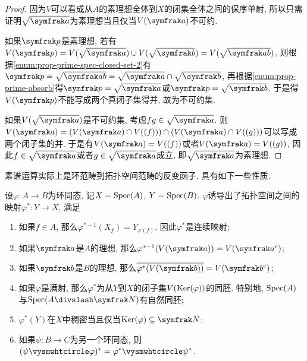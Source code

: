 \begin{proof}
  因为$V$可以看成从$A$的素理想全体到$X$的闭集全体之间的保序单射, 所以只需证明$\sqrt{\ideal{a}}$为素理想当且仅当$V(\ideal{a})$不可约.

  如果$\ideal{p}$是素理想, 若有$V(\ideal{p})=V(\sqrt{\ideal{a}})\cup V(\sqrt{\ideal{b}})=V(\sqrt{\ideal{ab}})$, 则根据\ref{enum:prop-prime-spec-closed-set-2}有$\ideal{p}=\sqrt{\ideal{ab}}=\sqrt{\ideal{a}}\cap\sqrt{\ideal{b}}$, 再根据\ref{enum:prop-prime-absorb}得$\ideal{p}=\sqrt{\ideal{a}}$或$\ideal{p}=\sqrt{\ideal{b}}$. 于是得$V(\ideal{p})$不能写成两个真闭子集得并, 故为不可约集.

  如果$V(\sqrt{\ideal{a}})$是不可约集, 考虑$fg\in\sqrt{\ideal{a}}$. 则$V(\ideal{a})=(V(\ideal{a})\cap V((f)))\cap (V(\ideal{a})\cap V((g)))$可以写成两个闭子集的并. 于是有$V(\ideal{a})=V((f))$或者$V(\ideal{a})=V((g))$, 因此$f\in \sqrt{\ideal{a}}$或者$g\in \sqrt{\ideal{a}}$成立, 即$\sqrt{\ideal{a}}$为素理想.
\end{proof}

素谱运算实际上是环范畴到拓扑空间范畴的反变函子, 具有如下一些性质.

\begin{proposition}\label{prop:primespecfunctor}
  设$\varphi\colon A\to B$为环同态, 记$X=\operatorname{Spec} (A)$, $Y=\operatorname{Spec} (B)$. $\varphi$诱导出了拓扑空间之间的映射$\varphi^*\colon Y\to X$, 满足
  \begin{enumerate}
    \item\label{enum:prop-prime-spec-functor-continuous} 如果$f\in A$, 那么$\varphi^{*-1}(X_f)=Y_{\varphi(f)}$. 因此$\varphi^*$是连续映射;
    \item 如果$\ideal{a}$是$A$的理想, 那么$\varphi^{*-1}(V(\ideal{a}))=V(\ideal{a}^e)$;
    \item 如果$\ideal{b}$是$B$的理想, 那么$\overline{\varphi^*(V(\ideal{b}))}=V(\ideal{b}^c)$;
    \item\label{enum:prop-prime-spec-functor-surjective} 如果$\varphi$是满射, 那么$\varphi^*$为从$Y$到$X$的闭子集$V(\operatorname{Ker} (\varphi))$的同胚. 特别地, $\operatorname{Spec} (A)$与$\Spec (A{\divslash}\nil)$有自然同胚;
    \item $\varphi^*(Y)$在$X$中稠密当且仅当$\Ker (\varphi)\subseteq \nil$;
    \item\label{enum:prop-prime-spec-functor-composite} 如果$\psi\colon B\to C$为另一个环同态, 则$(\psi\composite\varphi)^*=\varphi^*\composite\psi^*$.
  \end{enumerate}
\end{proposition}

